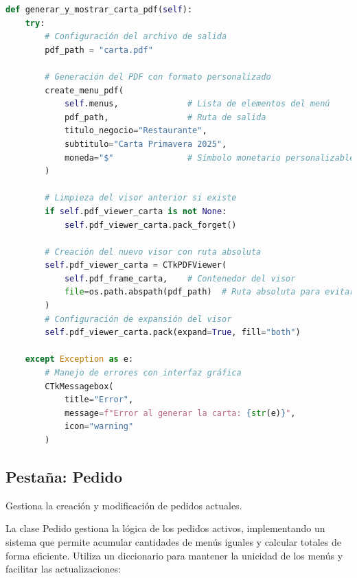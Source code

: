 \documentclass[12pt,letterpaper]{article}
\begin{document}
\begin{lstlisting}[language=Python, caption=Generación de Carta PDF]
def generar_y_mostrar_carta_pdf(self):
    try:
        # Configuración del archivo de salida
        pdf_path = "carta.pdf"
        
        # Generación del PDF con formato personalizado
        create_menu_pdf(
            self.menus,              # Lista de elementos del menú
            pdf_path,                # Ruta de salida
            titulo_negocio="Restaurante",
            subtitulo="Carta Primavera 2025",
            moneda="$"               # Símbolo monetario personalizable
        )
        
        # Limpieza del visor anterior si existe
        if self.pdf_viewer_carta is not None:
            self.pdf_viewer_carta.pack_forget()
        
        # Creación del nuevo visor con ruta absoluta
        self.pdf_viewer_carta = CTkPDFViewer(
            self.pdf_frame_carta,    # Contenedor del visor
            file=os.path.abspath(pdf_path)  # Ruta absoluta para evitar errores
        )
        # Configuración de expansión del visor
        self.pdf_viewer_carta.pack(expand=True, fill="both")
        
    except Exception as e:
        # Manejo de errores con interfaz gráfica
        CTkMessagebox(
            title="Error",
            message=f"Error al generar la carta: {str(e)}",
            icon="warning"
        )
\end{lstlisting}

\subsection{Pestaña: Pedido}
Gestiona la creación y modificación de pedidos actuales.

La clase Pedido gestiona la lógica de los pedidos activos, implementando un sistema que permite acumular cantidades de menús iguales y calcular totales de forma eficiente. Utiliza un diccionario para mantener la unicidad de los menús y facilitar las actualizaciones:
\end{document}
